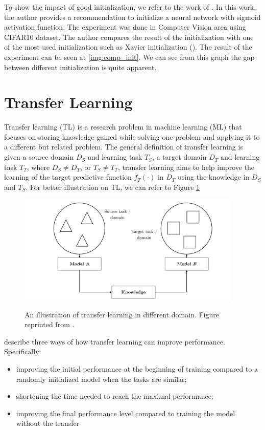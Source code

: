 To show the impact of good initialization, we refer to the work of \cite{kumar2017onweight}. In this work, the author provides a recommendation to initialize a neural network with sigmoid activation function. The experiment was done in Computer Vision area using CIFAR10 dataset. The author compares the result of the initialization with one of the most used initialization such as Xavier initialization (\cite{glorot2010understanding}). The result of the experiment can be seen at \ref{img:comp_init}. We can see from this graph the gap between different initialization is quite apparent.

\section{Transfer Learning}
\label{sec:bm_tl}
Transfer learning (TL) is a research problem in machine learning (ML) that focuses on storing knowledge gained while solving one problem and applying it to a different but related problem.
The general definition of transfer learning is given a source domain $D_S$ and learning task $T_S$, a target domain $D_T$ and learning task $T_T$, where $D_S \neq D_T$, or $T_S \neq T_T$, transfer learning aims to help improve the learning of the target predictive function $f_{T}(\cdot)$ in $D_T$ using the knowledge in $D_S$ and $T_S$. For better illustration on TL, we can refer to Figure \ref{img:transfer_learning}

\begin{figure}[h]
    {\includegraphics[width=0.95\textwidth]{img/transfer_learning_scenario.png}}
    \centering
    \caption{An illustration of transfer learning in different domain. Figure reprinted from \cite{ruder2019transfer}.}
    \label{img:transfer_learning}
\end{figure}

\cite{shavlik2010transfer} describe three ways of how transfer learning can
improve performance. Specifically:
\begin{itemize}
    \item improving the initial performance at the beginning of training compared
          to a randomly initialized model when the tasks are similar;
    \item shortening the time needed to reach the maximal performance;
    \item improving the final performance level compared to training the model
          without the transfer
\end{itemize}

